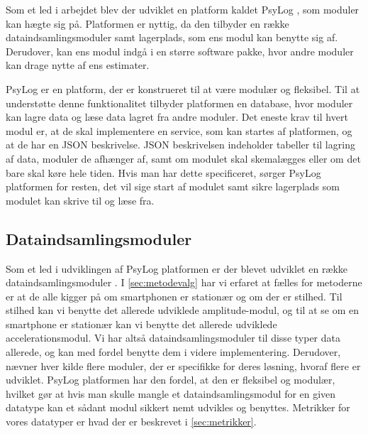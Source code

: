 Som et led i arbejdet blev der udviklet en platform kaldet PsyLog \citep{misc:faellesrapp}, som moduler kan hægte sig på.
Platformen er nyttig, da den tilbyder en række dataindsamlingsmoduler samt lagerplads, som ens modul kan benytte sig af.
Derudover, kan ens modul indgå i en større software pakke, hvor andre moduler kan drage nytte af ens estimater.

PsyLog er en platform, der er konstrueret til at være modulær og fleksibel.
Til at understøtte denne funktionalitet tilbyder platformen en database, hvor moduler kan lagre data og læse data lagret fra andre moduler.
Det eneste krav til hvert modul er, at de skal implementere en service, som kan startes af platformen, og at de har en JSON beskrivelse.
JSON beskrivelsen indeholder tabeller til lagring af data, moduler de afhænger af, samt om modulet skal skemalægges eller om det bare skal køre hele tiden.
Hvis man har dette specificeret, sørger PsyLog platformen for resten, det vil sige start af modulet samt sikre lagerplads som modulet kan skrive til og læse fra.

\subsection{Dataindsamlingsmoduler}
Som et led i udviklingen af PsyLog platformen er der blevet udviklet en række dataindsamlingsmoduler \citep{misc:faellesrapp}.
I \cref{sec:metodevalg} har vi erfaret at fælles for metoderne er at de alle kigger på om smartphonen er stationær og om der er stilhed. 
Til stilhed kan vi benytte det allerede udviklede amplitude-modul, og til at se om en smartphone er stationær kan vi benytte det allerede udviklede accelerationsmodul.
Vi har altså dataindsamlingsmoduler til disse typer data allerede, og kan med fordel benytte dem i videre implementering.
Derudover, nævner hver kilde flere moduler, der er specifikke for deres løsning, hvoraf flere er udviklet.
PsyLog platformen har den fordel, at den er fleksibel og modulær, hvilket gør at hvis man skulle mangle et dataindsamlingsmodul for en given datatype kan et sådant modul sikkert nemt udvikles og benyttes.
Metrikker for vores datatyper er hvad der er beskrevet i \cref{sec:metrikker}.
